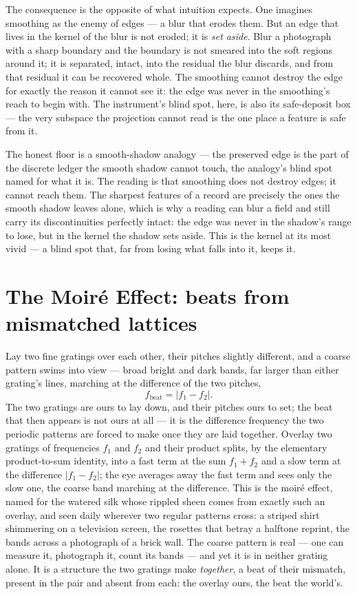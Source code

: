 The consequence is the opposite of what intuition expects. One imagines smoothing as the enemy of edges --- a
blur that erodes them. But an edge that lives in the kernel of the blur is not eroded; it is \emph{set aside}.
Blur a photograph with a sharp boundary and the boundary is not smeared into the soft regions around it; it is
separated, intact, into the residual the blur discards, and from that residual it can be recovered whole. The
smoothing cannot destroy the edge for exactly the reason it cannot see it: the edge was never in the
smoothing's reach to begin with. The instrument's blind spot, here, is also its safe-deposit box --- the very
subspace the projection cannot read is the one place a feature is safe from it.

The honest floor is a smooth-shadow analogy --- the preserved edge is the part of the discrete ledger the
smooth shadow cannot touch, the analogy's blind spot named for what it is. The reading is that smoothing does
not destroy edges; it cannot reach them. The sharpest features of a record are precisely the ones the smooth
shadow leaves alone, which is why a reading can blur a field and still carry its discontinuities perfectly
intact: the edge was never in the shadow's range to lose, but in the kernel the shadow sets aside. This is the
kernel at its most vivid --- a blind spot that, far from losing what falls into it, keeps it.

\section{The Moir\'e Effect: beats from mismatched lattices}
\label{se:moire}

Lay two fine gratings over each other, their pitches slightly different, and a coarse pattern swims into view
--- broad bright and dark bands, far larger than either grating's lines, marching at the difference of the two
pitches,
\begin{equation}
  f_{\mathrm{beat}} = |f_1 - f_2| .
\end{equation}
The two gratings are ours to lay down, and their pitches ours to set; the beat that then appears is not ours
at all --- it is the difference frequency the two periodic patterns are forced to make once they are laid
together. Overlay two gratings of frequencies $f_1$ and $f_2$ and their product splits, by the elementary
product-to-sum identity, into a fast term at the sum $f_1 + f_2$ and a slow term at the difference
$|f_1 - f_2|$; the eye averages away the fast term and sees only the slow one, the coarse band marching at the
difference. This is the moir\'e effect, named for the watered silk whose rippled sheen comes from exactly such
an overlay, and seen daily wherever two regular patterns cross: a striped shirt shimmering on a television
screen, the rosettes that betray a halftone reprint, the bands across a photograph of a brick wall. The coarse
pattern is real --- one can measure it, photograph it, count its bands --- and yet it is in neither grating
alone. It is a structure the two gratings make \emph{together}, a beat of their mismatch, present in the pair
and absent from each: the overlay ours, the beat the world's.

